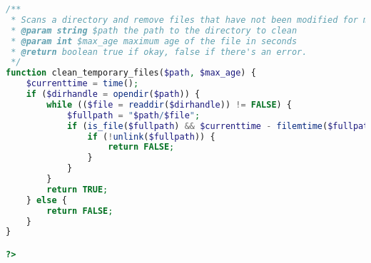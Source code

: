 \begin{lstlisting}[language=PHP,basicstyle=\tiny,caption=handle.php]
/**
 * Scans a directory and remove files that have not been modified for max_age
 * @param string $path the path to the directory to clean 
 * @param int $max_age maximum age of the file in seconds
 * @return boolean true if okay, false if there's an error.
 */
function clean_temporary_files($path, $max_age) {
	$currenttime = time();
	if ($dirhandle = opendir($path)) {
		while (($file = readdir($dirhandle)) != FALSE) {
			$fullpath = "$path/$file";
			if (is_file($fullpath) && $currenttime - filemtime($fullpath) > $max_age) {
				if (!unlink($fullpath)) {
					return FALSE;
				}
			}
		}
		return TRUE;
	} else {
		return FALSE;
	}
}

?>
\end{lstlisting}